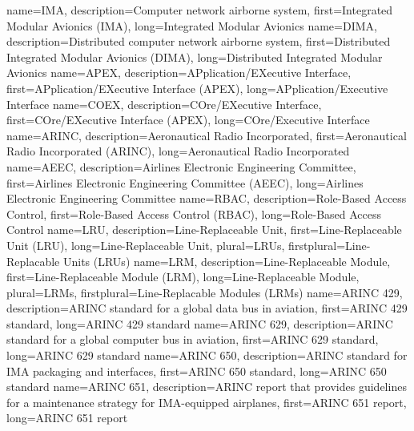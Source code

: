 {%
    name={IMA},
    description={Computer network airborne system},
    first={Integrated Modular Avionics (IMA)},
    long={Integrated Modular Avionics}
}
{%
    name={DIMA},
    description={Distributed computer network airborne system},
    first={Distributed Integrated Modular Avionics (DIMA)},
    long={Distributed Integrated Modular Avionics}
}
{%
    name={APEX},
    description={APplication/EXecutive Interface},
    first={APplication/EXecutive Interface (APEX)},
    long={APplication/Executive Interface}
}
{%
    name={COEX},
    description={COre/EXecutive Interface},
    first={COre/EXecutive Interface (APEX)},
    long={COre/Executive Interface}
}
{%
    name={ARINC},
    description={Aeronautical Radio Incorporated},
    first={Aeronautical Radio Incorporated (ARINC)},
    long={Aeronautical Radio Incorporated}
}
{%
    name={AEEC},
    description={Airlines Electronic Engineering Committee},
    first={Airlines Electronic Engineering Committee (AEEC)},
    long={Airlines Electronic Engineering Committee}
}
{%
    name={RBAC},
    description={Role-Based Access Control},
    first={Role-Based Access Control (RBAC)},
    long={Role-Based Access Control}
}
{%
    name={LRU},
    description={Line-Replaceable Unit},
    first={Line-Replaceable Unit (LRU)},
    long={Line-Replaceable Unit},
    plural={LRUs},
    firstplural={Line-Replacable Units (LRUs)}
}
{%
    name={LRM},
    description={Line-Replaceable Module},
    first={Line-Replaceable Module (LRM)},
    long={Line-Replaceable Module},
    plural={LRMs},
    firstplural={Line-Replacable Modules (LRMs)}
}
{%
    name={ARINC 429},
    description={ARINC standard for a global data bus in aviation},
    first={ARINC 429 standard},
    long={ARINC 429 standard}
}
{%
    name={ARINC 629},
    description={ARINC standard for a global computer bus in aviation},
    first={ARINC 629 standard},
    long={ARINC 629 standard}
}
{%
    name={ARINC 650},
    description={ARINC standard for IMA packaging and interfaces},
    first={ARINC 650 standard},
    long={ARINC 650 standard}
}
{%
    name={ARINC 651},
    description={ARINC report that provides guidelines for a maintenance strategy for IMA-equipped airplanes},
    first={ARINC 651 report},
    long={ARINC 651 report}
}
